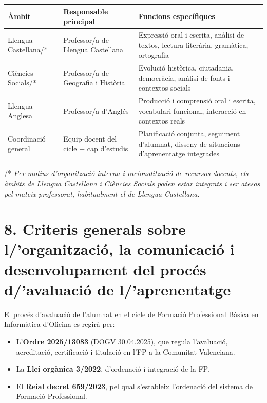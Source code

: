 \documentclass[
  paper=a4,
  ,captions=tableheading
]{scrartcl}
\providecommand{\tightlist}{%
  \setlength{\itemsep}{0pt}\setlength{\parskip}{0pt}}
\renewenvironment{quote}{\begin{customblockquote}\list{}{\rightmargin=0em\leftmargin=0em}%
\item\relax\color{blockquote-text}\ignorespaces}{\unskip\unskip\endlist\end{customblockquote}}
\begin{document}
\begin{longtable}[]{@{}lll@{}}
\toprule
\textbf{Àmbit} & \textbf{Responsable principal} & \textbf{Funcions
específiques} \\
\midrule
\endhead
Llengua Castellana/* & Professor/a de Llengua Castellana & Expressió
oral i escrita, anàlisi de textos, lectura literària, gramàtica,
ortografia \\
Ciències Socials/* & Professor/a de Geografia i Història & Evolució
històrica, ciutadania, democràcia, anàlisi de fonts i contextos
socials \\
Llengua Anglesa & Professor/a d'Anglés & Producció i comprensió oral i
escrita, vocabulari funcional, interacció en contextos reals \\
Coordinació general & Equip docent del cicle + cap d'estudis &
Planificació conjunta, seguiment d'alumnat, disseny de situacions
d'aprenentatge integrades \\
\bottomrule
\end{longtable}

\begin{quote}
/* \emph{Per motius d'organització interna i racionalització de recursos
docents, els àmbits de Llengua Castellana i Ciències Socials poden estar
integrats i ser atesos pel mateix professorat, habitualment el de
Llengua Castellana.}
\end{quote}

\hypertarget{criteris-generals-sobre-lorganitzaciuxf3-la-comunicaciuxf3-i-desenvolupament-del-procuxe9s-davaluaciuxf3-de-laprenentatge}{%
\section{8. Criteris generals sobre l/'organització, la comunicació i
desenvolupament del procés d/'avaluació de
l/'aprenentatge}\label{criteris-generals-sobre-lorganitzaciuxf3-la-comunicaciuxf3-i-desenvolupament-del-procuxe9s-davaluaciuxf3-de-laprenentatge}}

El procés d'avaluació de l'alumnat en el cicle de Formació Professional
Bàsica en Informàtica d'Oficina es regirà per:

\begin{itemize}
\tightlist
\item
  L'\textbf{Ordre 2025/13083} (DOGV 30.04.2025), que regula l'avaluació,
  acreditació, certificació i titulació en l'FP a la Comunitat
  Valenciana.
\item
  La \textbf{Llei orgànica 3/2022}, d'ordenació i integració de la FP.
\item
  El \textbf{Reial decret 659/2023}, pel qual s'estableix l'ordenació
  del sistema de Formació Professional.
\end{itemize}
\end{document}

